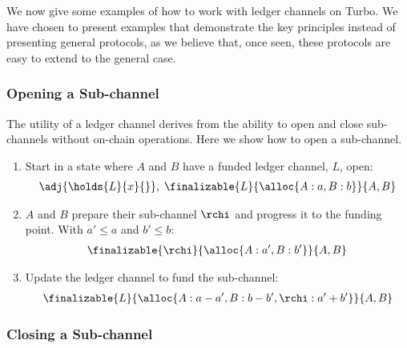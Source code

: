 We now give some examples of how to work with ledger channels on Turbo.
We have chosen to present examples that demonstrate the key principles instead of presenting general protocols, as we believe that, once seen, these protocols are easy to extend to the general case.

\subsubsection{Opening a Sub-channel}

\begin{figure}[h]\centering
  \makebox[\textwidth][c]{}
  \caption{
  }\label{fig:opening-sub-channel}
\end{figure}

The utility of a ledger channel derives from the ability to open and close sub-channels without on-chain operations.
Here we show how to open a sub-channel.
\begin{enumerate}
  \item Start in a state where $A$ and $B$ have a funded ledger channel, $L$, open:
  \begin{align}
    \adj{\holds{L}{x}{}}, \; \finalizable{L}{\alloc{A: a, B: b}}{A, B}
  \end{align}
  \item $A$ and $B$ prepare their sub-channel $\rchi$ and progress it to the funding point. With $a' \leq a$ and $b' \leq b$:
  \begin{align}
    \finalizable{\rchi}{\alloc{A:a', B:b'}}{A,B}
  \end{align}
  \item Update the ledger channel to fund the sub-channel:
  \begin{align}
    \finalizable{L}{\alloc{A:a-a', B: b - b', \rchi: a' + b'}}{A,B}
  \end{align}
\end{enumerate}

\subsubsection{Closing a Sub-channel}

\begin{figure}[h]\centering
  \makebox[\textwidth][c]{}
  \caption{
  }\label{fig:closing-sub-channel}
\end{figure}

